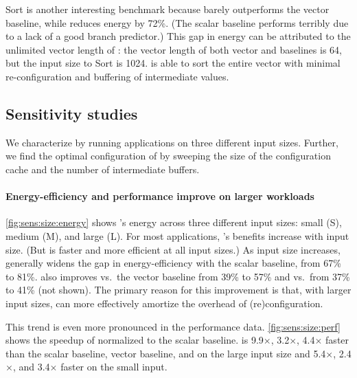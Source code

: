 Sort is another interesting benchmark because \manic barely outperforms the vector baseline, while \snafuarch reduces energy by 72\%.
(The scalar baseline performs terribly due to a lack of a good branch predictor.)
% 
This gap in energy can be attributed to the unlimited vector length of \snafuarch:
% 
the vector length of both vector and \manic baselines is 64, but the input size to Sort is 1024.
% 
\snafuarch is able to sort the entire vector with minimal re-configuration
and buffering of intermediate values.

\subsection{Sensitivity studies}
We characterize \snafuarch by running applications on three different input sizes. %
% 
Further, we find the optimal configuration of \snafuarch by sweeping the size of the configuration cache %
and the number of intermediate buffers. %


\paragraph{Energy-efficiency and performance improve on larger workloads}
\autoref{fig:sens:size:energy} shows \snafuarch's energy across three different input sizes: small (S), medium (M), and large (L). 
%
For most applications, \snafuarch's benefits increase with input size.
(But \snafuarch is faster and more efficient at all input sizes.)
%
As input size increases, \snafuarch generally widens the gap in energy-efficiency with the scalar baseline, from 67\% to 81\%.
%
\snafuarch also improves vs.\ the vector baseline from 39\% to 57\% and vs.\ \manic from 37\% to 41\% (not shown).
% 
The primary reason for this improvement is that, with larger input sizes, \snafuarch can more effectively amortize the overhead of (re)configuration.
% 

This trend is even more pronounced in the performance data.
% 
\autoref{fig:sens:size:perf} shows the speedup of \snafuarch normalized to the scalar baseline.
%
\snafuarch is 9.9$\times$, 3.2$\times$, 4.4$\times$ faster than the scalar baseline, vector baseline, and \manic on the large input size and 5.4$\times$, 2.4$\times$, and 3.4$\times$ faster on the small input.

